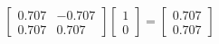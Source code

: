 \documentclass[preview]{standalone}
\begin{document}
\begin{align*}
\begin{bmatrix} 0.707 & -0.707 \\ 0.707 & 0.707 \end{bmatrix} \begin{bmatrix} 1 \\ 0 \end{bmatrix} = \begin{bmatrix} 0.707 \\ 0.707 \end{bmatrix}
\end{align*}
\end{document}
